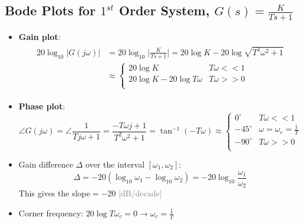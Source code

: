\documentclass[12pt,a4paper]{article}
\begin{document}
\subsection{Bode Plots for $1^{st}$ Order System, $G(s) = \frac{K}{Ts+1}$}
\begin{itemize}
\item \textbf{Gain plot}: 
\begin{align*}
\begin{split}
 20\log_{10}\lvert G(j\omega) \rvert  &= 20\log_{10} \lvert \frac{K}{Ts+1} \rvert = 20\log K-20\log\sqrt{T^{2}\omega^{2}+1} \\
 &\approx 
\begin{cases} 
20 \log K & T\omega<<1\\
20 \log K - 20\log T\omega &  T\omega>>0\\
\end{cases} \end{split} \end{align*}
\item  \textbf{Phase plot}: 
\[\angle G(j\omega) = \angle \frac{1}{Tj\omega+1}=\frac{-T\omega j +1}{T^{2}\omega^{2}+1}=\tan^{-1}(-T\omega)\approx \begin{cases}
0^{\circ} & T\omega<<1\\
-45^{\circ}& \omega=\omega_{c}=\frac{1}{T}\\
-90^{\circ}& T\omega>>0\\
\end{cases}\]
\item Gain difference $\Delta$ over the interval $[\omega_{1}, \omega_{2}] $: \[ \Delta = -20(\log_{10}\omega_{1}-\log_{10}\omega_{2})=\boxed{-20 \log_{10}\frac{\omega_{1}}{\omega_{2}}}\]
This gives the slope$=- 20$ \textcolor{gray}{[dB/decade]}
\item Corner frequency: $20\log T\omega_{c}=0 \to \omega_{c} = \frac{1}{T}$


\end{itemize}
\end{document}

